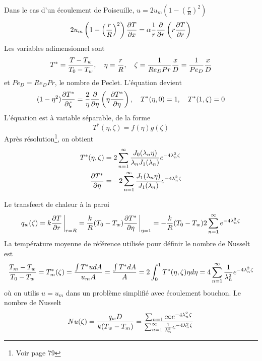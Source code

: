       Dans le cas d'un écoulement de Poiseuille, $u = 2u_m \left(1 - \left(\frac{r}{R}\right)^2\right)$
      \begin{equation}
        2u_m \left(1 - \left(\frac{r}{R}\right)^2\right) \pdv{T}{x} = \alpha \frac{1}{r} \pdv{r} \left(r\pdv{T}{r}\right)
      \end{equation}
      Les variables adimensionnel sont
      \begin{equation}
        T^\ast = \frac{T-T_w}{T_0 - T_w}, \quad \eta = \frac{r}{R}, \quad \zeta = \frac{1}{Re_D Pr} \frac{x}{D} = \frac{1}{Pe_D} \frac{x}{D}
      \end{equation}
      et $Pe_D = Re_D Pr$, le nombre de Peclet. L'équation devient
      \begin{equation}
        (1-\eta^2) \pdv{T^\ast}{\zeta} = \frac{2}{\eta} \pdv{\eta} \left(\eta \pdv{T^\ast}{\eta}\right), \quad T^\ast (\eta, 0) = 1, \quad T^\ast (1, \zeta) = 0
      \end{equation}
      L'équation est à variable séparable, de la forme
      \begin{equation}
        T^\ast (\eta, \zeta) = f(\eta)g(\zeta)
      \end{equation}
      Après résolution\footnote{Voir page 79}, on obtient
      \begin{equation}
        \begin{aligned}
          T^\ast (\eta, \zeta) &= 2 \sum_{n=1}^\infty \frac{J_0 (\lambda_n \eta)}{\lambda_n J_1(\lambda_n)} e^{-4\lambda_n^2 \zeta}\\
          \pdv{T^\ast}{\eta} &= -2 \sum_{n=1}^\infty \frac{J_1(\lambda_n \eta)}{J_1(\lambda_n)} e^{-4\lambda_n^2 \zeta}
        \end{aligned}
      \end{equation}

      Le transfeert de chaleur à la paroi
      \begin{equation}
        q_w(\zeta) = k \pdv{T}{r}\eval_{r=R} = \frac{k}{R}(T_0 - T_w) \pdv{T^\ast}{\eta} \eval_{\eta = 1} = -\frac{k}{R} (T_0 - T_w) 2 \sum_{n=1}^\infty e^{-4 \lambda_n^2 \zeta}
      \end{equation}
      La température moyenne de référence utilisée pour définir le nombre de Nusselt est
      \begin{equation}
        \frac{T_m - T_w}{T_0 - T_w} = T_m^\ast(\zeta) = \frac{\int T^\ast u dA}{u_m A} = \frac{\int T^\ast dA}{A} = 2 \int_0^1 T^\ast(\eta, \zeta) \eta d\eta = 4 \sum_{n=1}^{\infty} \frac{1}{\lambda_n^2}e^{-4 \lambda_n^2 \zeta}
      \end{equation}
      où on utilis $u=u_m$ dans un problème simplifié avec écoulement bouchon. Le nombre de Nusselt
      \begin{equation}
        Nu(\zeta) = \frac{q_w D}{k (T_w - T_m)} = \frac{\sum_{n=1}{\infty} e^{-4 \lambda_n^2 \zeta}}{\sum_{n=1}^\infty \frac{1}{\lambda_n^2} e^{-4 \lambda_n^2 \zeta}}
      \end{equation}

